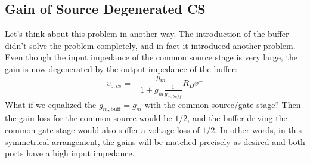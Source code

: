 \subsection{Gain of Source Degenerated CS}
Let's think about this problem in another way.   The introduction of the buffer didn't solve the problem completely, and in fact it introduced another problem.  Even though the input impedance of the common source stage is very large, the gain is now degenerated by the output impedance of the buffer:   
    \begin{equation}
        v_{o,cs} = -\frac{g_m}{1+g_m \frac{1}{g_{m,buff}} } R_D v^-    
    \end{equation}
What if we equalized the $g_{m,\text{buff}} = g_m$ with the common source/gate stage?  Then the gain loss for the common source would be $1/2$, and the buffer driving the common-gate stage would also suffer a voltage loss of $1/2$.  In other words, in this symmetrical arrangement, the gains will be matched precisely as desired and both ports have a high input impedance.
